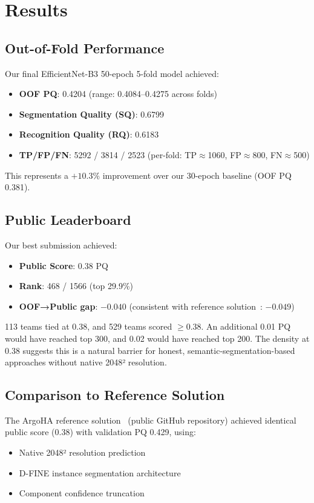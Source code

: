 \documentclass[conference]{IEEEtran}
\begin{document}
\section{Results}

\subsection{Out-of-Fold Performance}

Our final EfficientNet-B3 50-epoch 5-fold model achieved:
\begin{itemize}
    \item \textbf{OOF PQ}: 0.4204 (range: 0.4084--0.4275 across folds)
    \item \textbf{Segmentation Quality (SQ)}: 0.6799
    \item \textbf{Recognition Quality (RQ)}: 0.6183
    \item \textbf{TP/FP/FN}: 5292 / 3814 / 2523 (per-fold: TP$\approx$1060, FP$\approx$800, FN$\approx$500)
\end{itemize}

This represents a $+10.3\%$ improvement over our 30-epoch baseline (OOF PQ 0.381).

\subsection{Public Leaderboard}

Our best submission achieved:
\begin{itemize}
    \item \textbf{Public Score}: 0.38 PQ
    \item \textbf{Rank}: 468 / 1566 (top 29.9\%)
    \item \textbf{OOF→Public gap}: $-0.040$ (consistent with reference solution~\cite{argoha2026}: $-0.049$)
\end{itemize}

113 teams tied at 0.38, and 529 teams scored $\geq 0.38$. An additional 0.01 PQ would have reached top 300, and 0.02 would have reached top 200. The density at 0.38 suggests this is a natural barrier for honest, semantic-segmentation-based approaches without native 2048² resolution.

\subsection{Comparison to Reference Solution}

The ArgoHA reference solution~\cite{argoha2026} (public GitHub repository) achieved identical public score (0.38) with validation PQ 0.429, using:
\begin{itemize}
    \item Native 2048² resolution prediction
    \item D-FINE instance segmentation architecture
    \item Component confidence truncation
\end{itemize}
\end{document}
